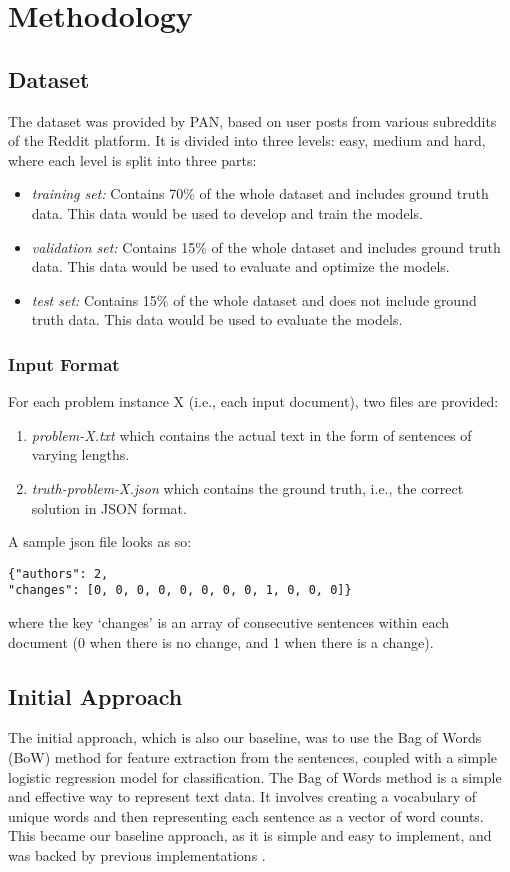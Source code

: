 \section{Methodology}
\subsection{Dataset}
The dataset was provided by PAN, based on user posts from various subreddits of the Reddit platform. It is divided into three levels: easy, medium and hard, where each level is split into three parts:
\begin{itemize}
    \item \textit{training set:} Contains 70\% of the whole dataset and includes ground truth data. This data would be used to develop and train the models.
    \item \textit{validation set:} Contains 15\% of the whole dataset and includes ground truth data. This data would be used to evaluate and optimize the models.
    \item \textit{test set:} Contains 15\% of the whole dataset and does not include ground truth data. This data would be used to evaluate the models.
\end{itemize}

\subsubsection*{Input Format}
For each problem instance X (i.e., each input document), two files are provided:
\begin{enumerate}
    \item \textit{problem-X.txt} which contains the actual text in the form of sentences of varying lengths.
    \item \textit{truth-problem-X.json} which contains the ground truth, i.e., the correct solution in JSON format. 
\end{enumerate}

\noindent A sample json file looks as so:
\begin{verbatim}
{"authors": 2,
"changes": [0, 0, 0, 0, 0, 0, 0, 0, 1, 0, 0, 0]}
\end{verbatim}
where the key `changes' is an array of consecutive sentences within each document (0 when there is no change, and 1 when there is a change). 

\subsection{Initial Approach}
The initial approach, which is also our baseline, was to use the Bag of Words (BoW) method for feature extraction from the sentences, coupled with a simple logistic regression model for classification. The Bag of Words method is a simple and effective way to represent text data. It involves creating a vocabulary of unique words and then representing each sentence as a vector of word counts. This became our baseline approach, as it is simple and easy to implement, and was backed by previous implementations \cite{paper1}.

